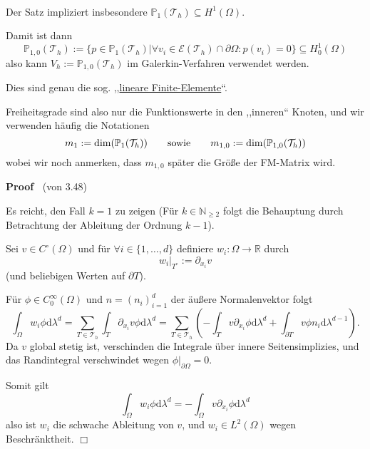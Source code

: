 \documentclass{book}
\newcommand{\assign}{:=}
\newcommand{\mathd}{\mathrm{d}}
\newcommand{\nobracket}{}
\newenvironment{proof}{\noindent\textbf{Proof\ }}{\hspace*{\fill}$\Box$\medskip}
\begin{document}
\begin{remark*}
  \
  
  Der Satz impliziert insbesondere $\mathbb{P}_1 (\mathcal{T}_h) \subseteq
  H^1 (\Omega)$.
  
  Damit ist dann
  \[ \mathbb{P}_{1, 0} (\mathcal{T}_h) \assign \{ p \in \mathbb{P}_1
     (\mathcal{T}_h)  | \nobracket \forall v_i \in \mathscr{E} (\mathcal{T}_h)
     \cap \partial \Omega : p (v_i) = 0 \} \subseteq H^1_0 (\Omega) \]
  also kann $V_h \assign \mathbb{P}_{1, 0} (\mathcal{T}_h)$ im
  Galerkin-Verfahren verwendet werden.
  
  Dies sind genau die sog. ,,{\underline{lineare Finite-Elemente}}``.
  
  Freiheitsgrade sind also nur die Funktionswerte in den ,,inneren`` Knoten,
  und wir verwenden h{\"a}ufig die Notationen
  \[ m_1 \assign \dim (\mathbb{P}_1 (\mathcal{T}_h)) \text{\qquad
     sowie\qquad} m_{1, 0} \assign \dim (\mathbb{P}_{1, 0} (\mathcal{T}_h)) \]
  wobei wir noch anmerken, dass $m_{1, 0}$ sp{\"a}ter die Gr{\"o}{\ss}e der
  FM-Matrix wird. 
\end{remark*}

\begin{proof}
  (von 3.48)
  
  Es reicht, den Fall $k = 1$ zu zeigen (F{\"u}r $k \in \mathbb{N}_{\geqslant
  2}$ folgt die Behauptung durch Betrachtung der Ableitung der Ordnung $k -
  1$).
  
  Sei $v \in C^{\circ} (\Omega)$ und f{\"u}r $\forall i \in \{ 1, \ldots, d
  \}$ definiere $w_i : \Omega \rightarrow \mathbb{R}$ durch
  \[ w_i |_{T^{\circ}} \nobracket \assign \partial_{x_i} v \]
  (und beliebigen Werten auf $\partial T$).
  
  F{\"u}r $\phi \in C^{\infty}_0 (\Omega)$ und $n = (n_i)_{i = 1}^d$ der
  {\"a}u{\ss}ere Normalenvektor folgt
  \[ \int_{\Omega} w_i \phi \mathd \lambda^d = \sum_{T \in \mathcal{T}_h}
     \int_T \partial_{x_i} v \phi \mathd \lambda^d = \sum_{T \in
     \mathcal{T}_h} \left( - \int_T v \partial_{x_i} \phi \mathd \lambda^d +
     \int_{\partial T} v \phi n_i \mathd \lambda^{d - 1} \right) . \]
  {\hspace{1.7em}}Da $v$ global stetig ist, verschinden die Integrale {\"u}ber
  innere Seitensimplizies, und das Randintegral verschwindet wegen $\phi
  |_{\partial \Omega} \nobracket = 0$.
  
  Somit gilt
  \[ \int_{\Omega} w_i \phi \mathd \lambda^d = - \int_{\Omega} v
     \partial_{x_i} \phi \mathd \lambda^d \]
  also ist $w_i$ die schwache Ableitung von $v$, und $w_i \in L^2 (\Omega)$
  wegen Beschr{\"a}nktheit.
\end{proof}
\end{document}

